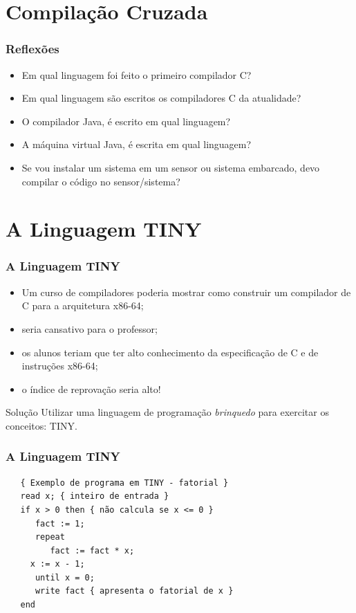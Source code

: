 \documentclass[table]{beamer}
\begin{document}
\section{Compilação Cruzada}
\begin{frame}
   \frametitle{Reflexões}
   \begin{itemize}
      \item Em qual linguagem foi feito o primeiro compilador C?
      \item Em qual linguagem são escritos os compiladores C da atualidade?
      \item O compilador Java, é escrito em qual linguagem?
      \item A máquina virtual Java, é escrita em qual linguagem?
      \item Se vou instalar um sistema em um sensor ou sistema embarcado, devo compilar o código no sensor/sistema?
   \end{itemize}
\end{frame}

\section{A Linguagem TINY}

\begin{frame}
   \frametitle{A Linguagem TINY}
   \begin{itemize}
      \item Um curso de compiladores poderia mostrar como construir um compilador de C para a arquitetura x86-64;
      \item seria cansativo para o professor;
      \item os alunos teriam que ter alto conhecimento da especificação de C e de instruções x86-64;
      \item o índice de reprovação seria alto!
   \end{itemize}
   \begin{block}{Solução}
   Utilizar uma linguagem de programação \textit{brinquedo} para exercitar os conceitos: TINY.
   \end{block}
\end{frame}

\begin{frame}[fragile]
   \frametitle{A Linguagem TINY}
   \begin{verbatim}
   { Exemplo de programa em TINY - fatorial }
   read x; { inteiro de entrada }
   if x > 0 then { não calcula se x <= 0 }
      fact := 1;
      repeat
         fact := fact * x;
	 x := x - 1;
      until x = 0;
      write fact { apresenta o fatorial de x }
   end
   \end{verbatim}
\end{frame}
\end{document}
